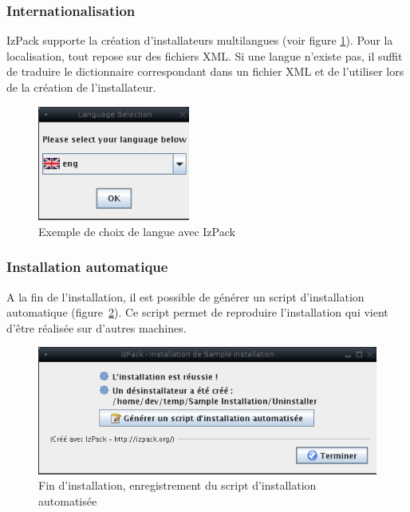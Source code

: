 \subsubsection{Internationalisation}
IzPack supporte la création d'installateurs multilangues (voir figure \ref{fig:LangChoice}).
Pour la localisation, tout repose sur des fichiers XML.
Si une langue n'existe pas, il suffit de traduire le dictionnaire correspondant dans un fichier XML et de l'utiliser lors de la création de l'installateur.
\begin{figure}[H]
	\centering
	\includegraphics[width=5cm]{../image/LangChoice.png}
	\caption{Exemple de choix de langue avec IzPack}
	\label{fig:LangChoice}
\end{figure}

\subsubsection{Installation automatique}
A la fin de l'installation, il est possible de générer un script d'installation automatique (figure~\ref{fig:SaveInstallXML}).
Ce script permet de reproduire l'installation qui vient d'être réalisée sur d'autres machines.
\begin{figure}[H]
	\centering
	\includegraphics[width=12cm]{../image/SaveInstallXML.png}
	\caption{Fin d'installation, enregistrement du script d'installation automatisée}
	\label{fig:SaveInstallXML}
\end{figure}
